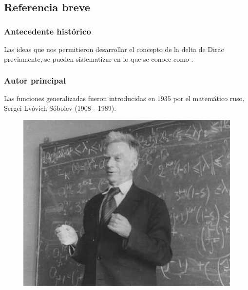 \documentclass[12pt]{beamer}
\begin{document}
\subsection{Referencia breve}

\begin{frame}
\frametitle{Antecedente histórico}
Las ideas que nos permitieron desarrollar el concepto de la delta de Dirac previamente, se pueden sistematizar en lo que se conoce como .
\end{frame}

\begin{frame}
\frametitle{Autor principal}
Las funciones generalizadas fueron introducidas en 1935 por el matemático ruso, Sergei Lvóvich Sóbolev (1908 - 1989).
\begin{figure}
    \centering
    \includegraphics[scale=0.25]{Imagenes/Serguei_Sobolev.jpg}
\end{figure}
\end{frame}
\end{document}
